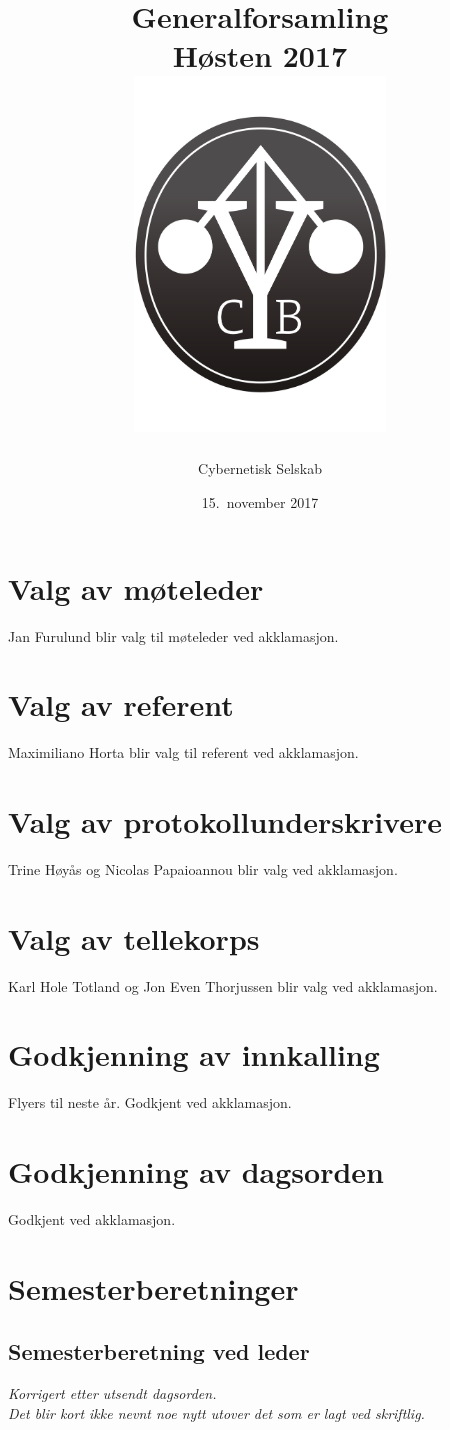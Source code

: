 \documentclass[10pt,norsk,a4paper]{article}
\title{Generalforsamling \\ Høsten 2017\\[3cm]
	\includegraphics[width=0.5\textwidth]{cyblogoa3.pdf}\\[-.5cm]}
\date{15.\ november 2017}
\author{Cybernetisk Selskab}
\begin{document}
\maketitle{}
\newpage
\tableofcontents{}


\section{Valg av møteleder}
 Jan Furulund blir valg til møteleder ved akklamasjon.

\section{Valg av referent}
 Maximiliano Horta blir valg til referent ved akklamasjon.

\section{Valg av protokollunderskrivere}
 Trine Høyås og Nicolas Papaioannou blir valg ved akklamasjon.

\section{Valg av tellekorps}
 Karl Hole Totland og Jon Even Thorjussen blir valg ved akklamasjon.

\section{Godkjenning av innkalling}
 Flyers til neste år. Godkjent ved akklamasjon.

\section{Godkjenning av dagsorden}
 Godkjent ved akklamasjon.

\section{Semesterberetninger}
\subsection{Semesterberetning ved leder}
\textit{\small Korrigert etter utsendt dagsorden.}\\
\textit{Det blir kort ikke nevnt noe nytt utover det som er lagt ved
skriftlig.}
\end{document}
